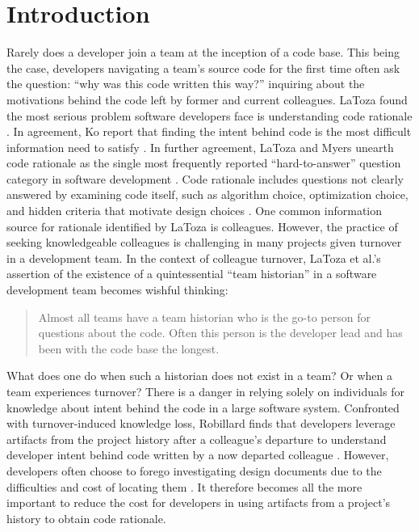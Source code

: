
\chapter{Introduction}
\label{ch:Introduction}


Rarely does a developer join a team at the inception of a code base. 
This being the case, developers navigating a team's source code for the first time often ask the question: 
``why was this code written this way?'' inquiring about the motivations behind the code left by former and current colleagues.
LaToza \etal found the most serious problem software developers face is understanding code rationale \cite{latoza_maintaining_2006}.
In agreement, Ko \etal report that finding the intent behind code is the most difficult information need to satisfy \cite{ko_information_2007}. 
In further agreement, LaToza and Myers unearth code rationale as the single most frequently reported “hard-to-answer” question category in software development \cite{latoza_hard-answer_2010}. 
Code rationale includes questions not clearly answered by examining code itself, such as algorithm choice, optimization choice, and hidden criteria that motivate design choices \cite{latoza_hard-answer_2010}. 
One common information source for rationale identified by LaToza \etal is colleagues. 
However, the practice of seeking knowledgeable colleagues is challenging in many projects given turnover in a development team. 
In the context of colleague turnover, LaToza et al.'s assertion of the existence of a quintessential ``team historian'' in a software development team \cite{latoza_maintaining_2006} becomes wishful thinking:

\begin{quote}
Almost all teams have a team historian who is the go-to person for questions about the
code. Often this person is the developer lead and has been with the code base the longest.
\end{quote}

What does one do when such a historian does not exist in a team? Or when a team experiences turnover?
There is a danger in relying solely on individuals for knowledge about intent behind the code in a large software system.
Confronted with turnover-induced knowledge loss, Robillard finds that developers leverage artifacts from the 
project history after a colleague’s departure to understand developer intent behind code written by a now departed colleague \cite{robillard_turnover-induced_2021}. 
However, developers often choose to forego investigating design documents due to the difficulties and cost of locating them \cite{latoza_maintaining_2006}.
It therefore becomes all the more important to reduce the cost for developers in using artifacts from a project's history to obtain code rationale. 

